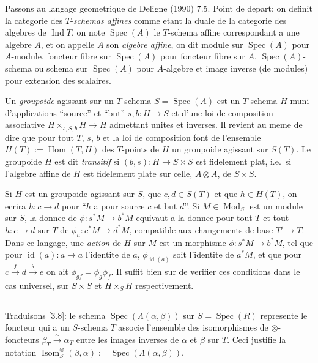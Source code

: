\documentclass[11pt,a4paper]{article}
\theoremstyle{plain}
\theoremstyle{definition}
\DeclareMathOperator{\Hom}{Hom}
\DeclareMathOperator{\Spec}{Spec}
\DeclareMathOperator{\Ind}{Ind}
\DeclareMathOperator{\id}{id}
\newcommand{\Isom}{\operatorname{Isom}}
\newcommand{\Mod}{\operatorname{Mod}}
\begin{document}
Passons au langage geometrique de Deligne (1990) 7.5. Point de depart: on definit la categorie des $T$-\emph{schemas affines} comme etant la duale de la categorie des algebres de $\Ind T$, on note $\Spec(A)$ le $T$-schema affine correspondant a une algebre $A$, et on appelle $A$ son \emph{algebre affine}, on dit module sur $\Spec(A)$ pour $A$-module, foncteur fibre sur $\Spec(A)$ pour foncteur fibre sur $A$, $\Spec(A)$-schema ou schema sur $\Spec(A)$ pour $A$-algebre et image inverse (de modules) pour extension des scalaires.

Un \emph{groupoide} agissant sur un $T$-schema $S=\Spec(A)$ est un $T$-schema $H$ muni d'applications ``source'' et ``but'' $s,b:H\to S$ et d'une loi de composition associative $H\times_{s,S,b}H\to H$ admettant unites et inverses. Il revient au meme de dire que pour tout $T$, $s$, $b$ et la loi de composition font de l'ensemble $H(T):=\Hom(T,H)$ des $T$-points de $H$ un groupoide agissant sur $S(T)$. Le groupoide $H$ est dit \emph{transitif} si $(b,s):H\to S\times S$ est fidelement plat, i.e.~si l'algebre affine de $H$ est fidelement plate sur celle, $A\otimes A$, de $S\times S$.

Si $H$ est un groupoide agissant sur $S$, que $c,d\in S(T)$ et que $h\in H(T)$, on ecrira $h:c\to d$ pour ``$h$ a pour source $c$ et but $d$''. Si $M\in\Mod_S$ est un module sur $S$, la donnee de $\phi:s^*M\to b^*M$ equivaut a la donnee pour tout $T$ et tout $h:c\to d$ sur $T$ de $\phi_h:c^*M\to d^*M$, compatible aux changements de base $T'\to T$. Dans ce langage, une \emph{action} de $H$ sur $M$ est un morphisme $\phi:s^*M\to b^*M$, tel que pour $\id(a):a\to a$ l'identite de $a$, $\phi_{\id(a)}$ soit l'identite de $a^*M$, et que pour $c\xrightarrow{f}d\xrightarrow{g}e$ on ait $\phi_{gf}=\phi_g\phi_f$. Il suffit bien sur de verifier ces conditions dans le cas universel, sur $S\times S$ et $H\times_S H$ respectivement.

\subsection{}\label{3.10}

Traduisons \ref{3.8}: le schema $\Spec(\Lambda(\alpha,\beta))$ sur $S=\Spec(R)$ represente le foncteur qui a un $S$-schema $T$ associe l'ensemble des isomorphismes de $\otimes$-foncteurs $\beta_T\xrightarrow{\sim}\alpha_T$ entre les images inverses de $\alpha$ et $\beta$ sur $T$. Ceci justifie la notation $\Isom^\otimes_S(\beta,\alpha):=\Spec(\Lambda(\alpha,\beta))$.
\end{document}
